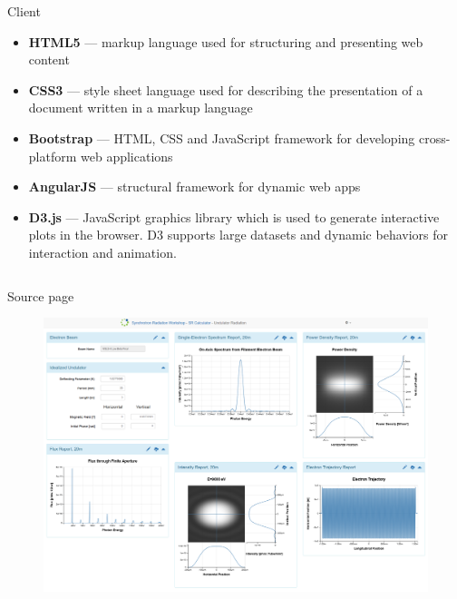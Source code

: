 \documentclass[final]{beamer}
\newlength{\onecolwid}
\newlength{\twocolwid}
\begin{document}
\begin{frame}[t]
\begin{columns}[t]
\begin{column}{\twocolwid}
\begin{columns}[t,totalwidth=\twocolwid]
\begin{column}{\onecolwid}

\begin{block}{\faFirefox{} \faChrome{} \faInternetExplorer{} Client}

\begin{itemize}
  \item {} \textbf{HTML5} --- markup language used for structuring and presenting web content
  \item {} \textbf{CSS3} --- style sheet language used for describing the presentation of a document written in a markup language
  \item \textbf{Bootstrap} --- HTML, CSS and JavaScript framework for developing cross-platform web
applications
  \item \textbf{AngularJS} --- structural framework for dynamic web apps
  \item \textbf{D3.js} --- JavaScript graphics library which is used to generate interactive plots in the browser. D3 supports large datasets and dynamic behaviors for interaction and animation.
\end{itemize}

\end{block}


\end{column} %
%
\end{columns} %


\begin{block}{\faLightbulbO{} Source page}

\begin{figure}
\includegraphics[width=0.85\linewidth]{images/source_page.png}
\end{figure}


\end{block}
\end{column}
\end{columns}
\end{frame}
\end{document}

